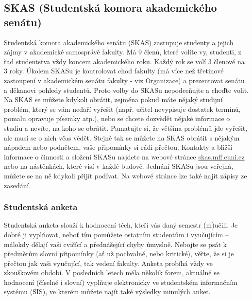\subsection[Studentská komora AS]{SKAS (Studentská komora akademického senátu)}
Studentská komora akademického senátu (SKAS) zastupuje studenty a jejich zájmy v
akademické samosprávě fakulty. Má 9 členů, které volíte vy, studenti, z řad
studentstva vždy koncem akademického roku. Každý rok se volí 3 členové na 3
roky. Úkolem SKASu je kontrolovat chod fakulty (má více než třetinové zastoupení
v akademickém senátu fakulty - viz Organizace) a prezentovat senátu a děkanovi
pohledy studentů. Proto volby do SKASu nepodceňujte a choďte volit.
Na SKAS se můžete kdykoli obrátit, zejména pokud máte nějaký studijní problém,
který se vám nedaří vyřešit (např. učitel nevypisuje dostatek termínů, pomalu
opravuje písemky atp.), nebo se chcete dozvědět nějaké informace o studiu a
nevíte, na koho se obrátit. Pamatujte si, že většina problémů jde vyřešit, ale
musí se o nich včas vědět. Stejně tak se můžete na SKAS obrátit s nějakým
nápadem nebo podnětem, vaše připomínky si rádi přečtou.
Kontakty a bližší informace o činnosti a složení SKASu najdete na webové stránce
\url{skas.mff.cuni.cz} nebo na nástěnkách, které visí v každé budově. Jednání
SKASu
jsou veřejná, můžete se na ně kdykoli přijít podívat. Na webové stránce lze také
najít zápisy ze zasedání.


\subsubsection{Studentská anketa}
Studentská anketa slouží k hodnocení těch, kteří vás daný semestr (m)učili. Je
dobré ji vyplňovat, neboť tím pomůžete ostatním studentům i vyučujícím – málokdy
dělají vaši cvičící a přednášející chyby úmyslně. Nebojte se psát k předmětům
slovní připomínky (ať už pochvalné, nebo kritické), věřte, že si je přečtou jak
vaši vyučující, tak vedení fakulty.
Anketa probíhá vždy ve zkouškovém období. V posledních letech měla několik
forem, aktuálně se hodnocení (číselné i slovní) vyplňuje elektronicky ve
studentském informačním systému (SIS), ve kterém můžete najít také výsledky
minulých anket.